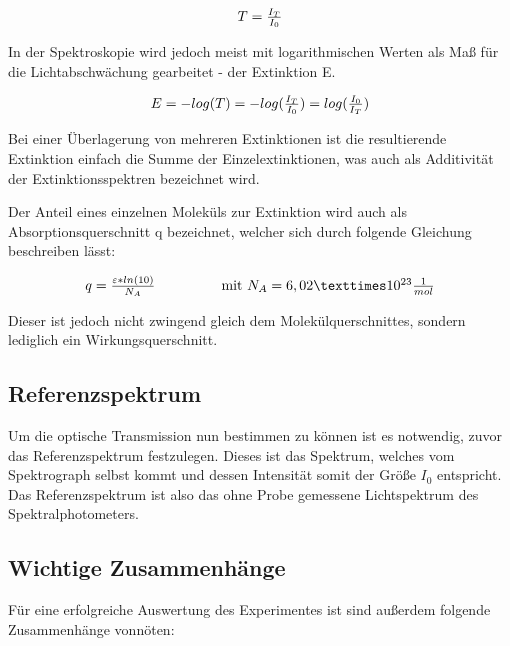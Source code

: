 \documentclass[12pt,a4paper,twoside]{article}
\begin{document}
\begin{equation}
    \label{eq:Transmission}
    \centerline{$T=\frac{I_{T}}{I_{0}}$}
\end{equation}

\noindent
In der Spektroskopie wird jedoch meist mit logarithmischen Werten als Maß für die Lichtabschwächung gearbeitet - der Extinktion E.

\begin{equation}
    \label{eq:Extinktion}
    \centerline{$E=-log(T)=-log(\frac{I_{T}}{I_{0}})=log(\frac{I_{0}}{I_{T}})$}
\end{equation}

\noindent
Bei einer Überlagerung von mehreren Extinktionen ist die resultierende Extinktion einfach die Summe der Einzelextinktionen, was auch als Additivität der Extinktionsspektren bezeichnet wird. \newline

\noindent
Der Anteil eines einzelnen Moleküls zur Extinktion wird auch als Absorptionsquerschnitt q bezeichnet, welcher sich durch folgende Gleichung beschreiben lässt:

\begin{equation}
    \label{eq:Absorptionsquerschnitt}
    \centerline{$q=\frac{\varepsilon *ln(10)}{N_{A}}$ \\ mit $N_{A}=6,02 × 10^{23} \frac{1}{mol}$}
\end{equation}

\noindent
Dieser ist jedoch nicht zwingend gleich dem Molekülquerschnittes, sondern lediglich ein Wirkungsquerschnitt.

\subsection{Referenzspektrum}

Um die optische Transmission nun bestimmen zu können ist es notwendig, zuvor das Referenzspektrum festzulegen. Dieses ist das Spektrum, welches vom Spektrograph selbst kommt und dessen Intensität somit der Größe $I_{0}$ entspricht.
Das Referenzspektrum ist also das ohne Probe gemessene Lichtspektrum des Spektralphotometers. 

\subsection{Wichtige Zusammenhänge}

Für eine erfolgreiche Auswertung des Experimentes ist sind außerdem folgende Zusammenhänge vonnöten:
\end{document}
